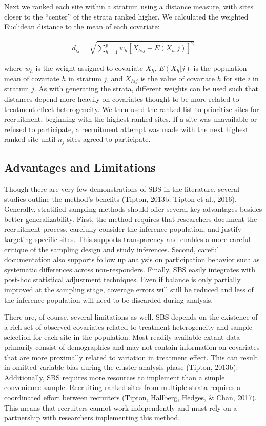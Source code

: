 \documentclass[man,floatsintext]{apa6}
\begin{document}
Next we ranked each site within a stratum using a distance measure, with sites closer to the \enquote{center} of the strata ranked higher. We calculated the weighted Euclidean distance to the mean of each covariate:

\begin{align} \label{eq:euclid}
d_{ij} = \sqrt{\sum^p_{h=1}w_h[X_{hij} - E(X_h|j)]^2}
\end{align}

where \(w_h\) is the weight assigned to covariate \(X_h\), \(E(X_h|j)\) is the population mean of covariate \(h\) in stratum \(j\), and \(X_{hij}\) is the value of covariate \(h\) for site \(i\) in stratum \(j\). As with generating the strata, different weights can be used such that distances depend more heavily on covariates thought to be more related to treatment effect heterogeneity. We then used the ranked list to prioritize sites for recruitment, beginning with the highest ranked sites. If a site was unavailable or refused to participate, a recruitment attempt was made with the next highest ranked site until \(n_j\) sites agreed to participate.

\hypertarget{advantages-and-limitations}{%
\subsection{Advantages and Limitations}\label{advantages-and-limitations}}

Though there are very few demonstrations of SBS in the literature, several studies outline the method's benefits (Tipton, 2013b; Tipton et al., 2016), Generally, stratified sampling methods should offer several key advantages besides better generalizability. First, the method requires that researchers document the recruitment process, carefully consider the inference population, and justify targeting specific sites. This supports transparency and enables a more careful critique of the sampling design and study inferences. Second, careful documentation also supports follow up analysis on participation behavior such as systematic differences across non-responders. Finally, SBS easily integrates with post-hoc statistical adjustment techniques. Even if balance is only partially improved at the sampling stage, coverage errors will still be reduced and less of the inference population will need to be discarded during analysis.

There are, of course, several limitations as well. SBS depends on the existence of a rich set of observed covariates related to treatment heterogeneity and sample selection for each site in the population. Most readily available extant data primarily consist of demographics and may not contain information on covariates that are more proximally related to variation in treatment effect. This can result in omitted variable bias during the cluster analysis phase (Tipton, 2013b). Additionally, SBS requires more resources to implement than a simple convenience sample. Recruiting ranked sites from multiple strata requires a coordinated effort between recruiters (Tipton, Hallberg, Hedges, \& Chan, 2017). This means that recruiters cannot work independently and must rely on a partnership with researchers implementing this method.
\end{document}
